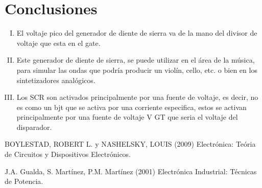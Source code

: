 \documentclass[osajnl,twocolumn,showpacs,superscriptaddress,10pt]{revtex4-1}
\begin{document}

\section{Conclusiones}


\begin{enumerate}[I.]
    \item El voltaje pico del generador de diente de sierra va de la mano del divisor de voltaje que esta en el gate.
    
    \item Este generador de diente de sierra, se puede utilizar en el área de la música, para simular las ondas que podría producir un violín, cello, etc. o bien en los sintetizadores analógicos.
    
    \item Los SCR son activados principalmente por una fuente de voltaje, es decir, no es como un bjt que se activa por una corriente especifica, estos se activan principalmente por una fuente de voltaje V GT que seria el voltaje del disparador.
\end{enumerate}




\begin{thebibliography}{99}

\bibitem{} BOYLESTAD, ROBERT L. y NASHELSKY, LOUIS (2009) Electrónica: Teória de Circuitos y Dispositivos Electrónicos.

\bibitem{} J.A. Gualda, S. Martínez, P.M. Martínez (2001) Electrónica Industrial: Técnicas de Potencia.

\end{thebibliography}
\end{document}
